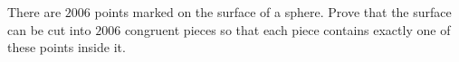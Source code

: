 There are $2006$ points marked on the surface of a sphere. Prove that the surface can be cut into $2006$ congruent pieces so that each piece contains exactly one of these points inside it.